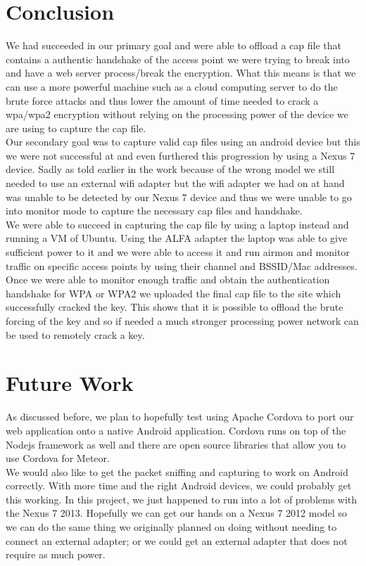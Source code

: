 \documentclass[12pt, titlepage]{article}
\begin{document}
\section{Conclusion}
We had succeeded in our primary goal and were able to offload a cap file that contains a authentic handshake of the access point we were trying to break into and have a web server process/break the encryption.  What this means is that we can use a more powerful machine such as a cloud computing server to do the brute force attacks and thus lower the amount of time needed to crack a wpa/wpa2 encryption without relying on the processing power of the device we are using to capture the cap file.  
\\
Our secondary goal was to capture valid cap files using an android device but this we were not successful at and even furthered this progression by using a Nexus 7 device.  Sadly as told earlier in the work because of the wrong model we still needed to use an external wifi adapter but the wifi adapter we had on at hand was unable to be detected by our Nexus 7 device and thus we were unable to go into monitor mode to capture the necessary cap files and handshake. 
\\
We were able to succeed in capturing the cap file by using a laptop instead and running a VM of Ubuntu.  Using the ALFA adapter the laptop was able to give sufficient power to it and we were able to access it and run airmon and monitor traffic on specific access points by using their channel and BSSID/Mac addresses.  Once we were able to monitor enough traffic and obtain the authentication handshake for WPA or WPA2 we uploaded the final cap file to the site which successfully cracked the key.  This shows that it is possible to offload the brute forcing of the key and so if needed a much stronger processing power network can be used to remotely crack a key.

\section{Future Work}
As discussed before, we plan to hopefully test using Apache Cordova to port our web application onto a native Android application. Cordova runs on top of the Nodejs framework as well and there are open source libraries that allow you to use Cordova for Meteor.
\\
We would also like to get the packet sniffing and capturing to work on Android correctly. With more time and the right Android devices, we could probably get this working. In this project, we just happened to run into a lot of problems with the Nexus 7 2013.  Hopefully we can get our hands on a Nexus 7 2012 model so we can do the same thing we originally planned on doing without needing to connect an external adapter; or we could get an external adapter that does not require as much power.
\end{document}
